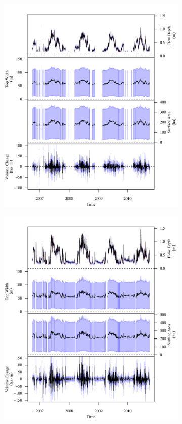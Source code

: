 \begin{linenumbers}
\begin{landscape}
\begin{figure}
\begin{subfigure}{0.7\textwidth}
			\includegraphics[width=\tableCustomSize]{"Figures/Results_USR/Stochastic/G TS C"}
		\end{subfigure}%
		\begin{subfigure}{0.7\textwidth}
			\centering			
			\includegraphics[width=\tableCustomSize]{"Figures/Results_USR/Stochastic/G TS D"}

\end{subfigure}
\end{figure}
\end{landscape}
\end{linenumbers}
